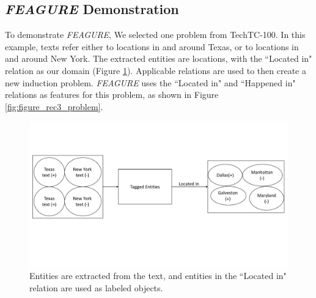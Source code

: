 \documentclass[letterpaper]{article} %
\theoremstyle{definition}
\begin{document}
		
		
		
		
		

\subsection{\emph{FEAGURE} Demonstration}

To demonstrate \emph{FEAGURE}, We selected one problem from TechTC-100. In this example, texts refer either to locations in and around Texas, or to locations in and around New York. The extracted entities are locations, with the ``Located in" relation as our domain (Figure \ref{fig:figure_rec3_example}). Applicable relations are used to then create a new induction problem. \emph{FEAGURE} uses the ``Located in" and ``Happened in" relations as features for this problem, as shown in Figure \ref{fig:figure_rec3_problem}. 

\begin{figure}[!h]
	\centering
	\includegraphics[width=\linewidth]{figure_rec3_example_new}
	\caption{Entities are extracted from the text, and entities in the ``Located in" relation are used as labeled objects.}
	\label{fig:figure_rec3_example}
\end{figure}
\end{document}

